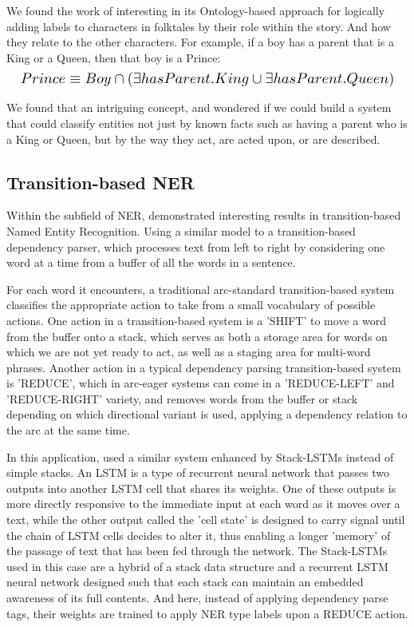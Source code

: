 \documentclass[11pt,a4paper]{article}
\begin{document}
We found the work of \citet{SuciuInterleavingontologybasedreasoning2014} interesting in its Ontology-based approach for logically adding labels to characters in folktales by their role within the story. And how they relate to the other characters. For example, if a boy has a parent that is a King or a Queen, then that boy is a Prince:
\begin{equation}
\resizebox{\linewidth}{!} 
  {
    $ Prince \equiv Boy \cap (\exists hasParent.King \cup \exists hasParent.Queen) $
  }
\end{equation}

We found that an intriguing concept, and wondered if we could build a system that could classify entities not just by known facts such as having a parent who is a King or Queen, but by the way they act, are acted upon, or are described.

\subsection{Transition-based NER}

Within the subfield of NER, \citet{LampleNeuralArchitecturesNamed2016} demonstrated interesting results in transition-based Named Entity Recognition. Using a similar model to a transition-based dependency parser, which processes text from left to right by considering one word at a time from a buffer of all the words in a sentence.

For each word it encounters, a traditional arc-standard transition-based system \cite{NivreIncrementalityDeterministicDependency2004} classifies the appropriate action to take from a small vocabulary of possible actions. One action in a transition-based system is a 'SHIFT' to move a word from the buffer onto a stack, which serves as both a storage area for words on which we are not yet ready to act, as well as a staging area for multi-word phrases. Another action in a typical dependency parsing transition-based system is 'REDUCE', which in arc-eager systems can come in a 'REDUCE-LEFT' and 'REDUCE-RIGHT' variety, and removes words from the buffer or stack depending on which directional variant is used, applying a dependency relation to the arc at the same time.

In this application, \citet{LampleNeuralArchitecturesNamed2016} used a similar system enhanced by Stack-LSTMs\cite{DyerTransitionBasedDependencyParsing2015} instead of simple stacks. An LSTM is a type of recurrent neural network that passes two outputs into another LSTM cell that shares its weights. One of these outputs is more directly responsive to the immediate input at each word as it moves over a text, while the other output called the 'cell state' is designed to carry signal until the chain of LSTM cells decides to alter it, thus enabling a longer 'memory' of the passage of text that has been fed through the network. The Stack-LSTMs used in this case are a hybrid of a stack data structure and a recurrent LSTM neural network designed such that each stack can maintain an embedded awareness of its full contents. And here, instead of applying dependency parse tags, their weights are trained to apply NER type labels upon a REDUCE action.
\end{document}
